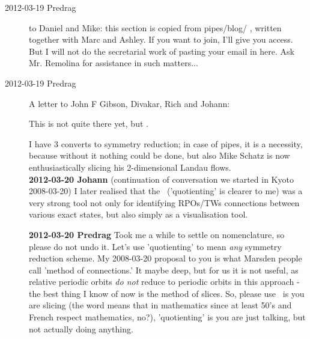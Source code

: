 \begin{description}

\item[2012-03-19 Predrag~~] to Daniel and Mike: this section is copied
from pipes/blog/ , written together with Marc and Ashley. If you want to
join, I'll give you access. But I will not do the secretarial work of
pasting your email in here. Ask Mr. Remolina for assistance in such
matters...

\item[2012-03-19 Predrag~~] A letter to John F Gibson, Divakar, Rich and
Johann:

This is not quite there yet, but .

I have 3 converts to symmetry reduction; in case of pipes, it is a
necessity, because without it nothing could be done, but also Mike Schatz
is now enthusiastically slicing his 2-dimensional Landau flows.
\\
{\bf 2012-03-20 Johann}
(continuation of conversation we started in Kyoto 2008-03-20)
I later realised that the \mslices\ ('quotienting' is clearer to me)
was a very strong tool not only for identifying RPOs/TWs connections
between various exact states, but also simply as a visualisation tool.

{\bf 2012-03-20 Predrag}
Took me a while to settle on nomenclature, so please do not undo it.
Let's use 'quotienting' to mean {\em any} symmetry reduction scheme. My
2008-03-20 proposal to you is what Marsden people call 'method of
connections.' It maybe deep, but for us it is not useful, as relative
periodic orbits \emph{do not} reduce to periodic orbits in this approach
- the best thing I know of now is the method of slices. So, please use
\mslices\ is you are slicing (the word means that in mathematics since at
least 50's and French respect mathematics, no?), 'quotienting' is you are
just talking, but not actually doing anything.


\end{description}
